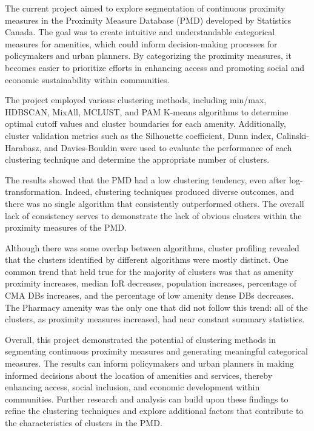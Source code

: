 \documentclass[11pt, a4paper]{article}
\begin{document}
The current project aimed to explore segmentation of continuous proximity measures in the Proximity Measure Database (PMD) developed by Statistics Canada. The goal was to create intuitive and understandable categorical measures for amenities, which could inform decision-making processes for policymakers and urban planners. By categorizing the proximity measures, it becomes easier to prioritize efforts in enhancing access and promoting social and economic sustainability within communities.
\par
The project employed various clustering methods, including min/max, HDBSCAN, MixAll, MCLUST, and PAM K-means algorithms to determine optimal cutoff values and cluster boundaries for each amenity. Additionally, cluster validation metrics such as the Silhouette coefficient, Dunn index, Calinski-Harabasz, and Davies-Bouldin were used to evaluate the performance of each clustering technique and determine the appropriate number of clusters.
\par
The results showed that the PMD had a low clustering tendency, even after log-transformation. Indeed, clustering techniques produced diverse outcomes, and there was no single algorithm that consistently outperformed others. The overall lack of consistency  serves to demonstrate the lack of obvious clusters within the proximity measures of the PMD.
\par
Although there was some overlap between algorithms, cluster profiling revealed that the clusters identified by different algorithms were mostly distinct. One common trend that held true for the majority of clusters was that as amenity proximity increases, median IoR decreases, population increases, percentage of CMA DBs increases, and the percentage of low amenity dense DBs decreases. The Pharmacy amenity was the only one that did not follow this trend: all of the clusters, as proximity measures increased, had near constant summary statistics.
\par
Overall, this project demonstrated the potential of clustering methods in segmenting continuous proximity measures and generating meaningful categorical measures. The results can inform policymakers and urban planners in making informed decisions about the location of amenities and services, thereby enhancing access, social inclusion, and economic development within communities. Further research and analysis can build upon these findings to refine the clustering techniques and explore additional factors that contribute to the characteristics of clusters in the PMD.
\end{document}

